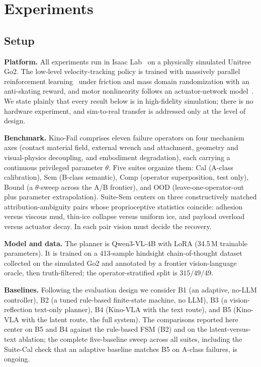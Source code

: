 \documentclass[conference]{IEEEtran}
\newcommand{\kinovla}{Kino-VLA}
\newcommand{\kinofail}{Kino-Fail}
\begin{document}
\section{Experiments}
\label{sec:experiments}

\subsection{Setup}
\textbf{Platform.} All experiments run in Isaac Lab~\cite{makoviychuk2021isaacgym,mittal2023orbit}
on a physically simulated Unitree Go2. The low-level velocity-tracking policy is
trained with massively parallel reinforcement learning~\cite{rudin2022learning}
under friction and mass domain randomization with an anti-skating reward, and motor
nonlinearity follows an actuator-network model~\cite{hwangbo2019learning}. We state
plainly that every result below is in high-fidelity simulation; there is no
hardware experiment, and sim-to-real transfer is addressed only at the level of
design.

\textbf{Benchmark.} \kinofail{} comprises eleven failure operators on four
mechanism axes (contact material field, external wrench and attachment, geometry
and visual-physics decoupling, and embodiment degradation), each carrying a
continuous privileged parameter $\theta$. Five suites organize them: Cal (A-class
calibration), Sem (B-class semantic), Comp (operator superposition, test only),
Bound (a $\theta$-sweep across the A/B frontier), and OOD (leave-one-operator-out
plus parameter extrapolation). Suite-Sem centers on three constructively matched
attribution-ambiguity pairs whose proprioceptive statistics coincide: adhesion
versus viscous mud, thin-ice collapse versus uniform ice, and payload overload
versus actuator decay. In each pair vision must decide the recovery.

\textbf{Model and data.} The planner is Qwen3-VL-4B with LoRA (34.5\,M trainable
parameters). It is trained on a 413-sample hindsight chain-of-thought dataset
collected on the simulated Go2 and annotated by a frontier vision-language oracle,
then truth-filtered; the operator-stratified split is $315/49/49$.

\textbf{Baselines.} Following the evaluation design we consider B1 (an adaptive,
no-LLM controller), B2 (a tuned rule-based finite-state machine, no LLM), B3 (a
vision-reflection text-only planner), B4 (\kinovla{} with the text route), and B5
(\kinovla{} with the latent route, the full system). The comparisons reported here
center on B5 and B4 against the rule-based FSM (B2) and on the latent-versus-text
ablation; the complete five-baseline sweep across all suites, including the
Suite-Cal check that an adaptive baseline matches B5 on A-class failures, is
ongoing.
\end{document}
